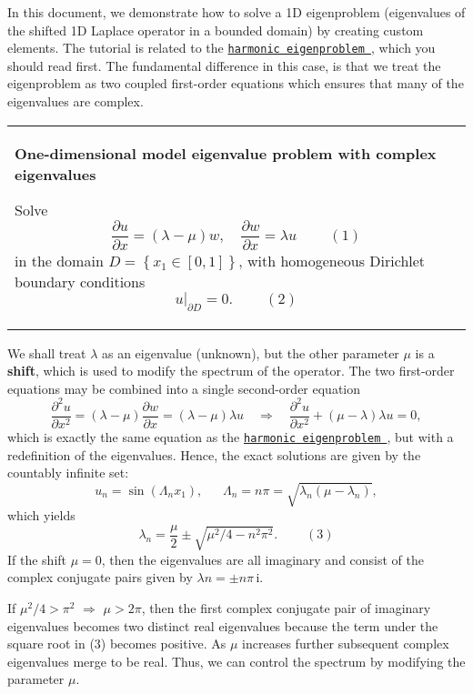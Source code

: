In this document, we demonstrate how to solve a 1D eigenproblem (eigenvalues of the shifted 1D Laplace operator in a bounded domain) by creating custom elements. The tutorial is related to the \href{../../harmonic/html/index.html}{\tt harmonic eigenproblem }, which you should read first. The fundamental difference in this case, is that we treat the eigenproblem as two coupled first-\/order equations which ensures that many of the eigenvalues are complex. \begin{center} \tabulinesep=1mm
\begin{longtabu} spread 0pt [c]{*{1}{|X[-1]}|}
\hline
\begin{center} {\bfseries One-\/dimensional model eigenvalue problem with complex eigenvalues} \end{center}  Solve \[ \frac{\partial u}{\partial x} = (\lambda - \mu) w, \quad \frac{\partial w}{\partial x} = \lambda u \ \ \ \ \ \ \ \ \ \ (1) \] in the domain $D =\left\{ x_1 \in [0,1] \right\}$, with homogeneous Dirichlet boundary conditions \[ \left. u\right|_{\partial D}=0. \ \ \ \ \ \ \ \ \ \ (2) \]   \\
\end{longtabu}
\end{center} 

We shall treat $ \lambda$ as an eigenvalue (unknown), but the other parameter $ \mu $ is a {\bfseries shift}, which is used to modify the spectrum of the operator. The two first-\/order equations may be combined into a single second-\/order equation \[ \frac{\partial^{2} u}{\partial x^{2}} = (\lambda - \mu) \frac{\partial w}{\partial x} = (\lambda - \mu) \lambda u \quad \Rightarrow\quad \frac{\partial^{2} u}{\partial x^{2}} + (\mu - \lambda) \lambda u = 0, \] which is exactly the same equation as the \href{../../harmonic/html/index.html}{\tt harmonic eigenproblem }, but with a redefinition of the eigenvalues. Hence, the exact solutions are given by the countably infinite set\+: \[ u_{n} = \sin (\Lambda_{n} x_{1}), \ \ \ \ \ \ \ \Lambda_{n} = n \pi = \sqrt{\lambda_{n}(\mu - \lambda_{n})}, \] which yields \[ \lambda_{n} = \frac{\mu}{2} \pm \sqrt{\mu^{2}/4 - n^{2}\pi^{2}}. \ \ \ \ \ \ \ \ \ \ (3) \] If the shift $\mu = 0$, then the eigenvalues are all imaginary and consist of the complex conjugate pairs given by $ \lambda{n} = \pm n \pi\, \mbox{i} $.

If $ \mu^{2}/4 > \pi^{2}$ $ \Rightarrow $ $ \mu > 2\pi $, then the first complex conjugate pair of imaginary eigenvalues becomes two distinct real eigenvalues because the term under the square root in (3) becomes positive. As $ \mu $ increases further subsequent complex eigenvalues merge to be real. Thus, we can control the spectrum by modifying the parameter $ \mu $.

